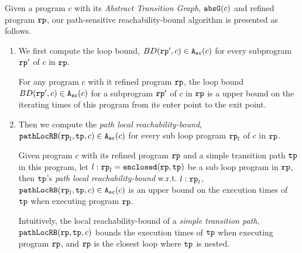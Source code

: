 Given a program $c$ with its \emph{Abstract Transition Graph}, $\mathtt{abs}{\mathtt{G}}(c)$ and refined program $\mathtt{rp}$, our path-sensitive reachability-bound algorithm is presented as follows.
\begin{enumerate}
  \item We first compute the loop bound, $BD(\mathtt{rp}', c) \in {\ensuremath{\mathtt{A_{sc}}}}(c)$ for every subprogram $\mathtt{rp}'$ of $c$ in $\mathtt{rp}$.
  \begin{defn}
    For any program $c$ with it refined program $\mathtt{rp}$,
    the loop bound $BD(\mathtt{rp}', c) \in {\ensuremath{\mathtt{A_{sc}}}}(c)$ for a subprogram $\mathtt{rp}'$ of $c$ in $\mathtt{rp}$ is a upper bound on the iterating times of this program from its enter point to the exit point.
  \end{defn}

  \item Then we compute the \emph{path local reachability-bound}, $\mathtt{pathLocRB}(\mathtt{rp}_l, \mathtt{tp}, c) \in {\ensuremath{\mathtt{A_{sc}}}}(c)$ for every sub loop program $\mathtt{rp}_l$ of $c$ in $\mathtt{rp}$.
      \begin{defn}
        Given program $c$ with its refined program $\mathtt{rp}$ and a simple transition path $\mathtt{tp}$ in this program, 
        let $l: \mathtt{rp}_l = \mathtt{enclosed}(\mathtt{rp}, \mathtt{tp})$ be a sub loop program in $\mathtt{rp}$,
        then $\mathtt{tp}$'s \emph{path local reachability-bound} w.r.t. $l: \mathtt{rp}_l$,  $\mathtt{pathLocRB}(\mathtt{rp}_l, \mathtt{tp}, c) \in {\ensuremath{\mathtt{A_{sc}}}}(c)$
       is an upper bound on the execution times of $\mathtt{tp}$ when executing program $\mathtt{rp}$.
    \end{defn}
    Intuitively, the local reachability-bound of a \emph{simple transition path},
    $\mathtt{pathLocRB}(\mathtt{rp}, \mathtt{tp}, c)$ bounds the execution times of $\mathtt{tp}$ when executing program $\mathtt{rp}$,
    and $\mathtt{rp}$ is the closest loop where $\mathtt{tp}$ is nested.


\end{enumerate}
